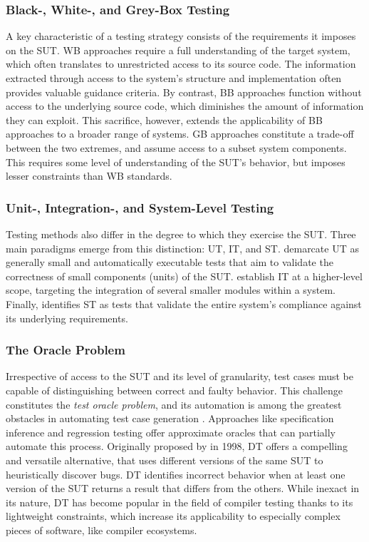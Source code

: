 \subsubsection{Black-, White-, and Grey-Box Testing}

A key characteristic of a testing strategy consists of 
the requirements it imposes on the \gls{SUT}. 
\Gls{WB} approaches require a full understanding of the target
system, which often translates to unrestricted access to its source code.
The information extracted through access to the system's structure
and implementation often provides valuable guidance criteria.
By contrast, \Gls{BB} approaches function without access to the underlying
source code, which diminishes the amount of information they can exploit.
This sacrifice, however, extends the applicability of \gls{BB} approaches 
to a broader range of systems.
\Gls{GB} approaches constitute a trade-off between the two 
extremes, and assume access to a subset system components.
This requires some level of understanding of the \gls{SUT}'s
behavior, but imposes lesser constraints than \gls{WB} standards.

\subsubsection{Unit-, Integration-, and System-Level Testing}

Testing methods also differ in the degree to which they exercise the \gls{SUT}.
Three main paradigms emerge from this distinction: 
\Gls{UT}, \Gls{IT}, and \gls{ST}.
\citet{daka2014survey} demarcate \gls{UT} as 
generally small and automatically executable tests that aim
to validate the correctness of small components (units) of the \gls{SUT}.
\citet{leung1990study} establish \gls{IT} at a higher-level scope, targeting
the integration of several smaller modules within a system.
Finally, \citet{umar2020comprehensive} identifies \gls{ST} as tests
that validate the entire system's compliance against its underlying
requirements.

\subsubsection{The Oracle Problem}

Irrespective of access to the \gls{SUT}
and its level of granularity, test cases must be capable
of distinguishing between correct and faulty behavior.
This challenge constitutes the
\textit{test oracle problem}, and its automation is among the 
greatest obstacles in automating test case generation \citep{barr2014oracle}.
Approaches like specification inference and regression testing offer
approximate oracles that can partially automate this process.
Originally proposed by \citet{mckeeman1998differential} in 1998, \Gls{DT}
offers a compelling and versatile alternative, that uses different versions
of the same \gls{SUT} to heuristically discover bugs.
\gls{DT} identifies incorrect behavior when at least
one version of the \gls{SUT} returns a result that differs from the others.
While inexact in its nature, \gls{DT} has become popular
in the field of compiler testing thanks to its lightweight 
constraints, which increase its applicability to especially complex
pieces of software, like compiler ecosystems.

